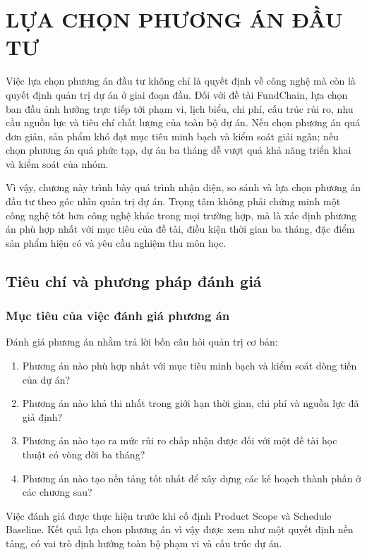 \chapter{LỰA CHỌN PHƯƠNG ÁN ĐẦU TƯ}

Việc lựa chọn phương án đầu tư không chỉ là quyết định về công nghệ mà còn là quyết định quản trị dự án ở giai đoạn đầu. Đối với đề tài FundChain, lựa chọn ban đầu ảnh hưởng trực tiếp tới phạm vi, lịch biểu, chi phí, cấu trúc rủi ro, nhu cầu nguồn lực và tiêu chí chất lượng của toàn bộ dự án. Nếu chọn phương án quá đơn giản, sản phẩm khó đạt mục tiêu minh bạch và kiểm soát giải ngân; nếu chọn phương án quá phức tạp, dự án ba tháng dễ vượt quá khả năng triển khai và kiểm soát của nhóm.

Vì vậy, chương này trình bày quá trình nhận diện, so sánh và lựa chọn phương án đầu tư theo góc nhìn quản trị dự án. Trọng tâm không phải chứng minh một công nghệ tốt hơn công nghệ khác trong mọi trường hợp, mà là xác định phương án phù hợp nhất với mục tiêu của đề tài, điều kiện thời gian ba tháng, đặc điểm sản phẩm hiện có và yêu cầu nghiệm thu môn học.

\section{Tiêu chí và phương pháp đánh giá}

\subsection{Mục tiêu của việc đánh giá phương án}

Đánh giá phương án nhằm trả lời bốn câu hỏi quản trị cơ bản:

\begin{enumerate}
  \item Phương án nào phù hợp nhất với mục tiêu minh bạch và kiểm soát dòng tiền của dự án?
  \item Phương án nào khả thi nhất trong giới hạn thời gian, chi phí và nguồn lực đã giả định?
  \item Phương án nào tạo ra mức rủi ro chấp nhận được đối với một đề tài học thuật có vòng đời ba tháng?
  \item Phương án nào tạo nền tảng tốt nhất để xây dựng các kế hoạch thành phần ở các chương sau?
\end{enumerate}

Việc đánh giá được thực hiện trước khi cố định Product Scope và Schedule Baseline. Kết quả lựa chọn phương án vì vậy được xem như một quyết định nền tảng, có vai trò định hướng toàn bộ phạm vi và cấu trúc dự án.

